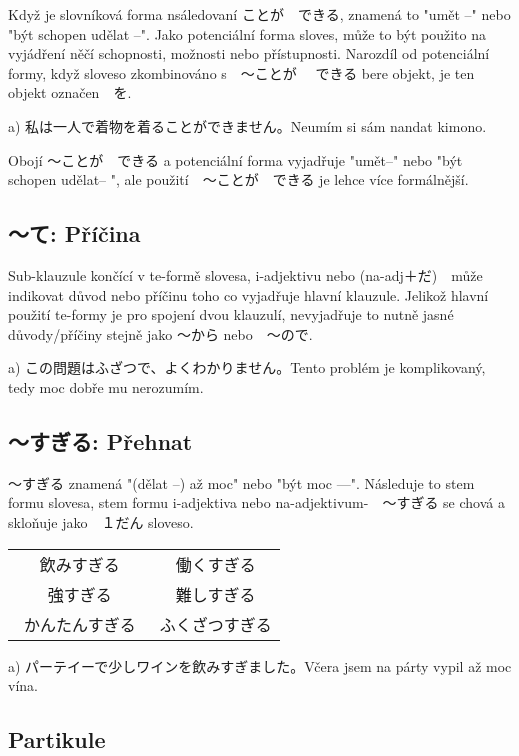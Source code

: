 Když je slovníková forma nsáledovaní ことが　できる, znamená to "umět --" nebo "být schopen udělat --". Jako potenciální forma sloves, může to být použito na vyjádření něčí schopnosti, možnosti  nebo přístupnosti. Narozdíl od potenciální formy, když sloveso zkombinováno s　〜ことが 　できる bere objekt, je ten objekt označen　を.

a) 私は一人で着物を着ることができません。Neumím si sám nandat kimono.

Obojí 〜ことが　できる a potenciální forma vyjadřuje "umět--" nebo "být schopen udělat-- ", ale použití　〜ことが　できる je lehce více formálnější.


\subsection{〜て: Příčina}

Sub-klauzule končící v te-formě slovesa, i-adjektivu nebo (na-adj＋だ)　může indikovat důvod nebo příčinu toho co vyjadřuje hlavní klauzule. Jelikož hlavní použití te-formy je pro spojení dvou klauzulí, nevyjadřuje to nutně jasné důvody/příčiny stejně jako  〜から nebo　〜ので.

a) この問題はふざつで、よくわかりません。Tento problém je komplikovaný, tedy moc dobře mu nerozumím.


\subsection{〜すぎる: Přehnat}

〜すぎる znamená "(dělat --) až moc" nebo "být moc ---". Následuje to stem formu slovesa, stem formu i-adjektiva nebo na-adjektivum-　〜すぎる se chová a skloňuje jako　１だん sloveso.
\begin{center}
\begin{tabular}{cc}
飲みすぎる	&		働くすぎる\\
強すぎる　	&		難しすぎる\\
かんたんすぎる　&		ふくざつすぎる\\
\end{tabular}
\end{center}

a) パーテイーで少しワインを飲みすぎました。Včera jsem na párty vypil až moc vína.

\subsection{Partikule}

